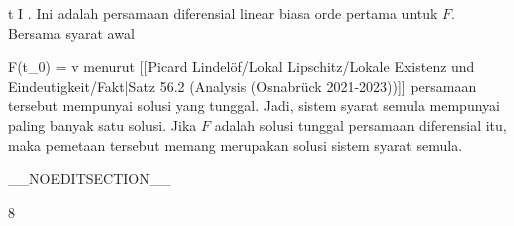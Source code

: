 {\mavergleichskette
{\vergleichskette
{ t
}
{ \in }{ I
}
{  }{
}
{    }{
}
{   }{
}
}
{}{}{}
. Ini adalah persamaan diferensial linear biasa orde pertama untuk $F$. Bersama syarat awal

\mavergleichskette
{\vergleichskette
{ F(t_0)
}
{ = }{ v
}
{ }{
}
{ }{
}
{ }{
}
}
{}{}{}
menurut
[[Picard Lindelöf/Lokal Lipschitz/Lokale Existenz und Eindeutigkeit/Fakt|Satz 56.2 (Analysis (Osnabrück 2021-2023))]]
persamaan tersebut mempunyai solusi yang tunggal. Jadi, sistem syarat semula mempunyai paling banyak satu solusi. Jika $F$ adalah solusi tunggal persamaan diferensial itu, maka pemetaan tersebut memang merupakan solusi sistem syarat semula.

 }

__NOEDITSECTION__

{8}

